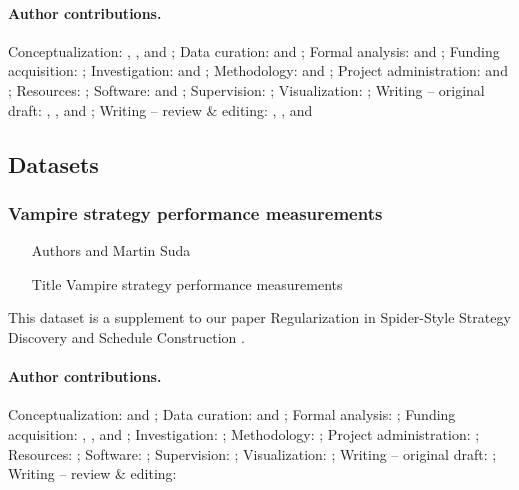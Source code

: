 \paragraph{Author contributions.}
Conceptualization:            \MS{}, \KC{}, and \FB{};
Data curation:                \MS{} and \KC{};
Formal analysis:              \MS{} and \KC{};
Funding acquisition:          \MS{};
Investigation:                \KC{} and \MS{};
Methodology:                  \MS{} and \KC{};
Project administration:       \MS{} and \FB{};
Resources:                    \JU{};
Software:                     \KC{} and \MS{};
Supervision:                  \MS{};
Visualization:                \MS{};
Writing -- original draft:    \MS{}, \KC{}, and \FB{};
Writing -- review \& editing: \FB{}, \MS{}, and \KC{}

\subsection{Datasets}

\subsubsection{Vampire strategy performance measurements}

\begin{itemize}
\item[Authors]  and Martin Suda
\item[Title] Vampire strategy performance measurements \cite{bartek10814478}
\end{itemize}

This dataset is a supplement to our paper
Regularization in Spider-Style Strategy Discovery and Schedule Construction \cite{DBLP:conf/ijcar/BartekCS24}.

\paragraph{Author contributions.}
Conceptualization:            \FB{} and \MS{};
Data curation:                \FB{} and \MS{};
Formal analysis:              \FB{};
Funding acquisition:          \MS{}, \JU{}, and \FB{};
Investigation:                \FB{};
Methodology:                  \FB{};
Project administration:       \MS{};
Resources:                    \JU{};
Software:                     \FB{};
Supervision:                  \MS{};
Visualization:                \FB{};
Writing -- original draft:    \FB{};
Writing -- review \& editing: \MS{}
